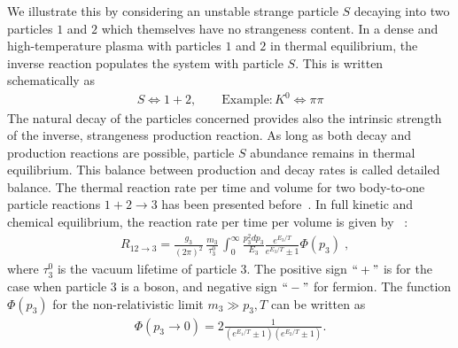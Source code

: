 \documentclass[universe,article,submit,moreauthors,pdftex,a4paper]{Definitions/mdpi}
\begin{document}
We illustrate this by considering an unstable strange particle $S$ decaying into two particles $1$ and $2$ which themselves have no strangeness content. In a dense and high-temperature plasma with particles $1$ and $2$ in thermal equilibrium, the inverse reaction populates the system with particle $S$. This is written schematically as
\begin{align}
 S\Longleftrightarrow1+2,\qquad \mathrm{Example}: K^0\Longleftrightarrow\pi\pi
\end{align}
The natural decay of the particles concerned provides also the intrinsic strength of the inverse, strangeness production reaction. As long as both decay and production reactions are possible, particle $S$ abundance remains in thermal equilibrium. This balance between production and decay rates is called detailed balance. The thermal reaction rate per time and volume for two body-to-one particle reactions $1+2\rightarrow 3$ has been presented before~\cite{Kuznetsova:2008jt,Kuznetsova:2010pi}. In full kinetic and chemical equilibrium, the reaction rate per time per volume is given by~\cite{Kuznetsova:2010pi} :
\begin{align}
&R_{12\to 3}=\frac{g_3}{(2\pi)^2}\,\frac{m_3}{\tau^0_3}\,\int^\infty_0\frac{p^2_3dp_3}{E_3}\frac{e^{E_3/T}}{e^{E_3/T}\pm1}\Phi(p_3)\;,
\end{align}
where $\tau^0_3$ is the vacuum lifetime of particle $3$. The positive sign $``+"$ is for the case when particle $3$ is a boson, and negative sign $``-"$ for fermion. The function $\Phi(p_3)$ for the non-relativistic limit $m_3\gg p_3,T$ can be written as 
\begin{align}
\Phi(p_3\to0)=2\frac{1}{(e^{E_1/T}\pm1)(e^{E_2/T}\pm1)}.
\end{align}
\end{document}

